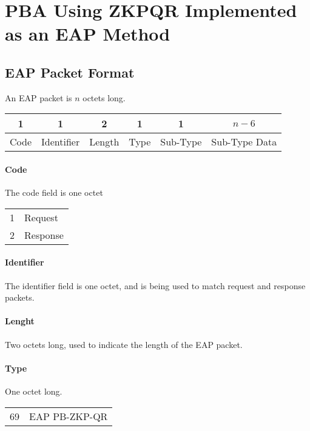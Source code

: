 \section{PBA Using ZKPQR Implemented as an EAP Method}

\subsection{EAP Packet Format}
An EAP packet is $n$ octets long.


\begin{center}
\begin{tabular}{|c|c|c|c|c|c|}
	\hline
	1 & 1 & 2 & 1 & 1 & $n - 6$\\
	\hline
	Code & Identifier & Length & Type & Sub-Type & Sub-Type Data\\
	\hline 
\end{tabular}
\end{center}

\paragraph{Code}
The code field is one octet

\bigskip

\begin{tabular}{ll}
	1 & Request \\
	2 & Response\\
\end{tabular}

\paragraph{Identifier} The identifier field is one octet, and is being used to match request and response packets.

\paragraph{Lenght} Two octets long, used to indicate the length of the EAP packet.

\paragraph{Type} One octet long.

\bigskip

\begin{tabular}{ll} %
	69 & EAP PB-ZKP-QR \\
\end{tabular}

